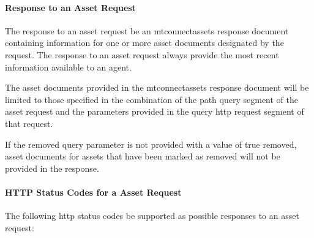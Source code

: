 \documentclass{mtconnect}	%
\begin{document}
\paragraph{Response to an Asset Request}\mbox{}

The \gls{response} to an \gls{asset request} \SHOULD be an \gls{mtconnectassets response document} containing information for one or more \glspl{asset document} designated by the \gls{request}.  
The \gls{response} to an \gls{asset request} \MUST always provide the most recent information available to an \gls{agent}.

The \glspl{asset document} provided in the \gls{mtconnectassets response document} will be limited to those specified in the combination of the \gls{path query} segment of the \gls{asset request} and the parameters provided in the \gls{query http request} segment of that \gls{request}.

If the \gls{removed} query parameter is not provided with a value of \gls{true removed}, \glspl{asset document} for \glspl{asset} that have been marked as removed will not be provided in the response. 

\paragraph{HTTP Status Codes for a Asset Request}\mbox{}

The following \glspl{http status code} \MUST be supported as possible responses to an \gls{asset request}:
\end{document}

